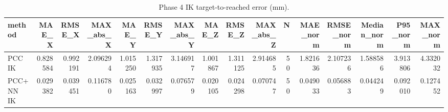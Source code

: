 \begin{table}
\caption{Phase 4 IK target-to-reached error (mm).}
\label{tab:phase4_extended}
\begin{tabular}{lrrrrrrrrrrrrrrr}
\toprule
method & MAE_X & RMSE_X & MAX_abs_X & MAE_Y & RMSE_Y & MAX_abs_Y & MAE_Z & RMSE_Z & MAX_abs_Z & N & MAE_norm & RMSE_norm & Median_norm & P95_norm & MAX_norm \\
\midrule
PCC IK & 0.828584 & 0.992191 & 2.096294 & 1.015250 & 1.317935 & 3.146917 & 1.001867 & 1.311125 & 2.914685 & 50 & 1.821636 & 2.107236 & 1.588586 & 3.913806 & 4.332032 \\
PCC+NN IK & 0.029382 & 0.039451 & 0.116780 & 0.025163 & 0.032997 & 0.076579 & 0.020105 & 0.024298 & 0.070747 & 50 & 0.049033 & 0.056883 & 0.044249 & 0.092010 & 0.127452 \\
\bottomrule
\end{tabular}
\end{table}
